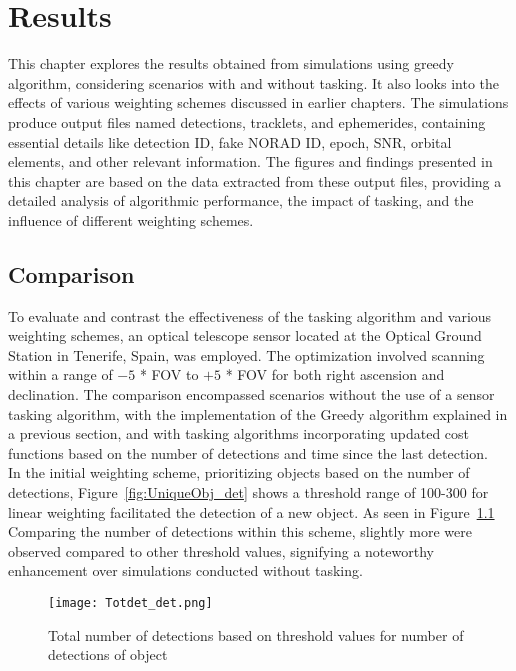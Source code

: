 \chapter{Results}
\label{sec:ergebnisse}
This chapter explores the results obtained from simulations using greedy algorithm, considering scenarios with and without tasking. It also looks into the effects of various weighting schemes discussed in earlier chapters. The simulations produce output files named detections, tracklets, and ephemerides, 
containing essential details like detection ID, fake NORAD ID, epoch, SNR, orbital elements, and other relevant information. The figures and findings presented in this chapter are based on the data extracted from these output files, providing a detailed analysis of algorithmic 
performance, the impact of tasking, and the influence of different weighting schemes.\\

\section{Comparison}
To evaluate and contrast the effectiveness of the tasking algorithm and various weighting schemes, an optical telescope sensor located at the Optical Ground Station in Tenerife, Spain, was employed. The optimization involved scanning within a range of $-5$ * FOV to $+5$ * FOV for both right ascension and declination. The comparison encompassed scenarios without the use of a sensor tasking algorithm, with the implementation of the Greedy algorithm explained in a previous section, and with tasking algorithms incorporating updated cost functions based on the number of detections and time since the last detection.\\

In the initial weighting scheme, prioritizing objects based on the number of detections, Figure~\ref{fig:UniqueObj_det} shows a threshold range of 100-300 for linear weighting facilitated the detection of a new object. As seen in Figure~\ref{fig:Totdet_det} Comparing the number of detections within this scheme, slightly more were observed compared to other threshold values, signifying a noteworthy enhancement over simulations conducted without tasking.\\

\begin{figure}[H]
	\centering
	\texttt{[image: Totdet\_det.png]}
	\caption{Total number of detections based on threshold values for number of detections of object}\label{fig:Totdet_det}
\end{figure}

